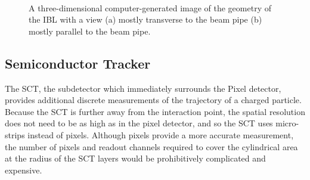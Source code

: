 \begin{figure}[hbtp]
\centering
{}\\
\caption{A three-dimensional computer-generated image of the geometry of the \ac{IBL} with a view (a) mostly transverse to the beam pipe (b) mostly parallel to the beam pipe.}
\label{fig:ibl_geometry}
\end{figure}

\subsection{Semiconductor Tracker}

The \ac{SCT}, the subdetector which immediately surrounds the Pixel detector, provides additional discrete measurements of the trajectory of a charged particle.
Because the \ac{SCT} is further away from the interaction point, the spatial resolution does not need to be as high as in the pixel detector, and so the \ac{SCT} uses micro-strips instead of pixels. 
Although pixels provide a more accurate measurement, the number of pixels and readout channels required to cover the cylindrical area at the radius of the \ac{SCT} layers would be prohibitively complicated and expensive.

